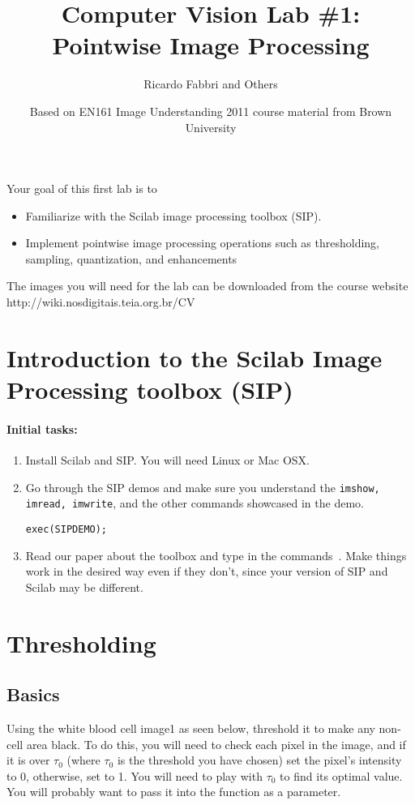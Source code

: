 



\title{Computer Vision Lab \#1: Pointwise Image Processing} 

\author{Ricardo Fabbri and Others \and Based on EN161 Image
Understanding 2011 course material from Brown University}


Your goal of this first lab is to 

\begin{itemize}
\item Familiarize with the Scilab image
processing toolbox (SIP).
\item Implement pointwise image processing operations such as thresholding,
sampling, quantization, and enhancements
\end{itemize}

The images you will need for the lab can be downloaded from the course
website
http://wiki.nosdigitais.teia.org.br/CV

\section{Introduction to the Scilab Image Processing toolbox (SIP)}

\paragraph{Initial tasks:}
\begin{enumerate}
\item Install Scilab and SIP. You will need Linux or Mac OSX.
\item Go through the SIP demos and make sure you understand the \texttt{imshow, imread,
imwrite}, and the other commands showcased in the demo.
\begin{lstlisting}
exec(SIPDEMO);
\end{lstlisting}
\item Read our paper about the toolbox and type in the commands~\cite{SIP}.
Make things work in the desired way even if they don't, since your version of
SIP and Scilab may be different.
\end{enumerate}

\section{Thresholding}

\subsection{Basics} Using the white blood cell image1 as seen below, threshold it to make any
non-cell area black. To do this, you will need to check each pixel in the image,
and if it is over $\tau_0$ (where $\tau_0$ is the threshold you have chosen) set the pixel’s
intensity to 0, otherwise, set to 1. You will need to play with $\tau_0$ to find its
optimal value. You will probably want to pass it into the function as a
parameter.
